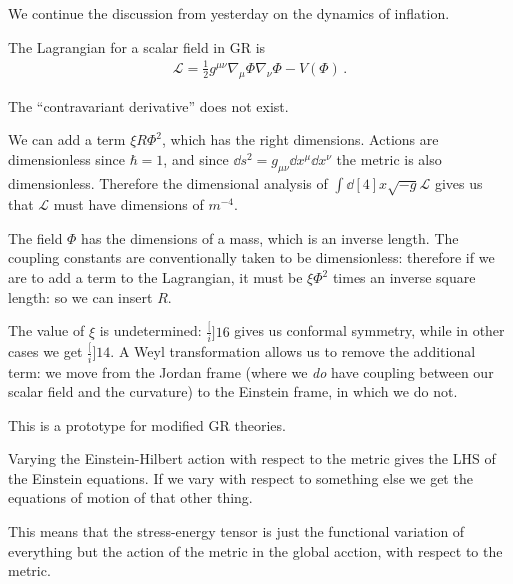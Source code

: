 \documentclass[main.tex]{subfiles}
\begin{document}

We continue the discussion from yesterday on the dynamics of inflation.

The Lagrangian for a scalar field in GR is 
%
\begin{align}
  \mathscr{L} = \frac{1}{2} g^{\mu \nu } \nabla_{\mu } \Phi  \nabla_{\nu } \Phi - V(\Phi )
\,.
\end{align}

The ``contravariant derivative'' does not exist.


We can add a term \(\xi R \Phi^2\), which has the right dimensions. Actions are dimensionless since \(\hbar  =1\), and since \(\dd{s^2} = g_{\mu \nu } \dd{x^{\mu }} \dd{x^{\nu }}\) the metric is also dimensionless. Therefore the dimensional analysis of \(\int \dd[4]{x} \sqrt{-g} \mathscr{L}\) gives us that \(\mathscr{L}\) must have dimensions of \(m^{-4}\).

The field \(\Phi \) has the dimensions of a mass, which is an inverse length. The coupling constants are conventionally taken to be dimensionless: therefore if we are to add a term to the Lagrangian, it must be \( \xi \Phi^2 \) times an inverse square length: so we can insert \(R\).

The value of \(\xi \) is undetermined: \(\frac[i]{1}{6} \) gives us conformal symmetry, while in other cases we get \(\frac[i]{1}{4} \). 
A Weyl transformation allows us to remove the additional term: we move from the Jordan frame (where we \emph{do} have coupling between our scalar field and the curvature) to the Einstein frame, in which we do not.

This is a prototype for modified GR theories.

Varying the Einstein-Hilbert action with respect to the metric gives the LHS of the Einstein equations. If we vary with respect to something else we get the equations of motion of that other thing.

This means that the stress-energy tensor is just the functional variation of everything but the action of the metric in the global acction, with respect to the metric.
\end{document}
